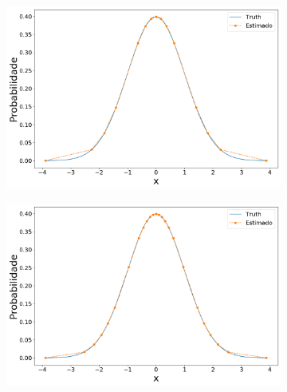\begin{figure}[H]
	\centering
	\begin{subfigure}[b]{0.45\textwidth}
		\centering 
		\includegraphics[width=\linewidth]{./figuras/iPDF2_normal_15_1_0_0}
		\caption{}
		\label{fig:ipdf2norm15}
	\end{subfigure}
	\hfill
	\begin{subfigure}[b]{0.45\textwidth}
		\centering 
		\includegraphics[width=\linewidth]{./figuras/iPDF2_normal_25_1_0_0}
		\caption{}
		\label{fig:ipdf2norm25}
	\end{subfigure}


\end{figure}
